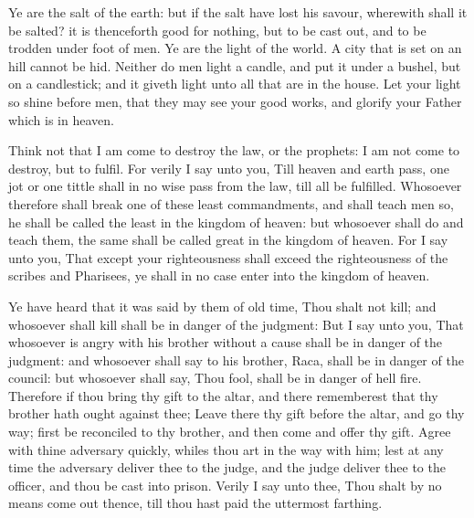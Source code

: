  Ye are the salt of the earth: but if the salt have lost
his savour, wherewith shall it be salted? it is thenceforth good for
nothing, but to be cast out, and to be trodden under foot of men.
 Ye are the light of the world. A city that is set on an
hill cannot be hid.  Neither do men light a candle, and put
it under a bushel, but on a candlestick; and it giveth light unto all
that are in the house.  Let your light so shine before men,
that they may see your good works, and glorify your Father which is in
heaven.

 Think not that I am come to destroy the law, or the
prophets: I am not come to destroy, but to fulfil.  For
verily I say unto you, Till heaven and earth pass, one jot or one tittle
shall in no wise pass from the law, till all be fulfilled. 
Whosoever therefore shall break one of these least commandments, and
shall teach men so, he shall be called the least in the kingdom of
heaven: but whosoever shall do and teach them, the same shall be called
great in the kingdom of heaven.  For I say unto you, That
except your righteousness shall exceed the righteousness of the scribes
and Pharisees, ye shall in no case enter into the kingdom of heaven.

 Ye have heard that it was said by them of old time, Thou
shalt not kill; and whosoever shall kill shall be in danger of the
judgment:  But I say unto you, That whosoever is angry with
his brother without a cause shall be in danger of the judgment: and
whosoever shall say to his brother, Raca, shall be in danger of the
council: but whosoever shall say, Thou fool, shall be in danger of hell
fire.  Therefore if thou bring thy gift to the altar, and
there rememberest that thy brother hath ought against thee;
 Leave there thy gift before the altar, and go thy way;
first be reconciled to thy brother, and then come and offer thy gift.
 Agree with thine adversary quickly, whiles thou art in the
way with him; lest at any time the adversary deliver thee to the judge,
and the judge deliver thee to the officer, and thou be cast into prison.
 Verily I say unto thee, Thou shalt by no means come out
thence, till thou hast paid the uttermost farthing.

